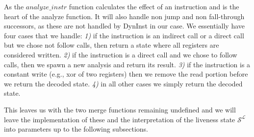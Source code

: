 
As the $analyze\_instr$ function calculates the effect of an instruction and is the heart of the analyze function. It will also handle non jump 
and non fall-through successors, as these are not handled by DynInst in our case. We essentially have four cases that we handle:
\textit{1)} if the instruction is an indirect call or a direct call but we chose not follow calls, then return a state where all registers are considered written.
\textit{2)} if the instruction is a direct call and we chose to follow calls, then we spawn a new analysis and return its result.
\textit{3)} if the instruction is a constant write (e.g., xor of two registers) then we remove the read portion before we return the decoded state.
\textit{4)} in all other cases we simply return the decoded state.

This leaves us with the two merge functions remaining undefined and we will leave the implementation of these and the interpretation of the  liveness state $\mathcal{S}^\mathcal{L}$ into parameters up to the following subsections.

